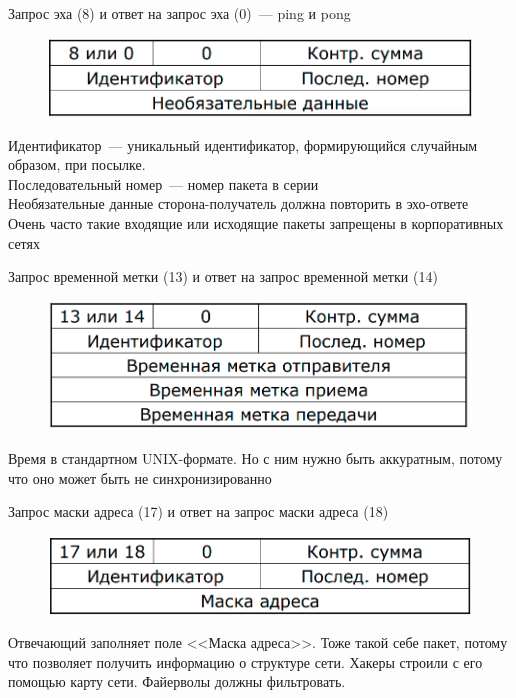 
\begin{MyItemize}
    \item Запрос эха (8) и ответ на запрос эха (0)~--- ping и pong\\
    \begin{figure}[H]
        \centering
        \includegraphics[width=15cm]{images/02/15}
    \end{figure}
    Идентификатор~--- уникальный идентификатор, формирующийся случайным образом, при посылке.\\
    Последовательный номер~--- номер пакета в серии\\
    Необязательные данные сторона-получатель должна повторить в эхо-ответе\\
    Очень часто такие входящие или исходящие пакеты запрещены в корпоративных сетях 
    \item Запрос временной метки (13) и ответ на запрос временной метки (14)\\
    \begin{figure}[H]
        \centering
        \includegraphics[width=15cm]{images/02/16}
    \end{figure}
    Время в стандартном UNIX-формате. Но с ним нужно быть аккуратным, потому что оно может быть не синхронизированно
    \item Запрос маски адреса (17) и ответ на запрос маски адреса (18)\\
    \begin{figure}[H]
        \centering
        \includegraphics[width=15cm]{images/02/17}
    \end{figure}
    Отвечающий заполняет поле <<Маска адреса>>. Тоже такой себе пакет, потому что позволяет получить информацию о структуре сети. Хакеры строили с его помощью карту сети. Файерволы должны фильтровать.
\end{MyItemize}